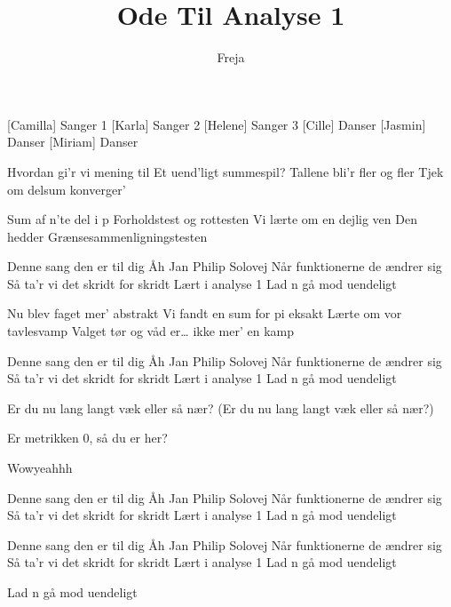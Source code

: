 \documentclass[a4paper,11pt]{article}
\title{Ode Til Analyse 1}
\author{Freja}
\begin{document}
\maketitle

\begin{roles}
[Camilla] Sanger 1
[Karla] Sanger 2
[Helene] Sanger 3
[Cille] Danser
[Jasmin] Danser
[Miriam] Danser
\end{roles}

\begin{song}

 Hvordan gi’r vi mening til
Et uend’ligt summespil?
Tallene bli’r fler og fler
Tjek om delsum konverger’

 Sum af n’te del i p
Forholdstest og rottesten
Vi lærte om en dejlig ven
 Den hedder Grænsesammenligningstesten

 Denne sang den er til dig
Åh Jan Philip Solovej
Når funktionerne de ændrer sig
Så ta’r vi det skridt for skridt
Lært i analyse 1
Lad n gå mod uendeligt

 Nu blev faget mer’ abstrakt
Vi fandt en sum for pi eksakt
Lærte om vor tavlesvamp
 Valget tør og våd er… ikke mer’ en kamp 

 Denne sang den er til dig
Åh Jan Philip Solovej
Når funktionerne de ændrer sig
Så ta’r vi det skridt for skridt
Lært i analyse 1
Lad n gå mod uendeligt

 Er du nu lang langt væk eller så nær?
 (Er du nu lang langt væk eller så nær?)

 Er metrikken 0, så du er her?

 Wowyeahhh

 Denne sang den er til dig
Åh Jan Philip Solovej
Når funktionerne de ændrer sig
Så ta’r vi det skridt for skridt
Lært i analyse 1
Lad n gå mod uendeligt

 Denne sang den er til dig
Åh Jan Philip Solovej
Når funktionerne de ændrer sig
Så ta’r vi det skridt for skridt
Lært i analyse 1
Lad n gå mod uendeligt

 Lad n gå mod uendeligt

\end{song}
\end{document}
